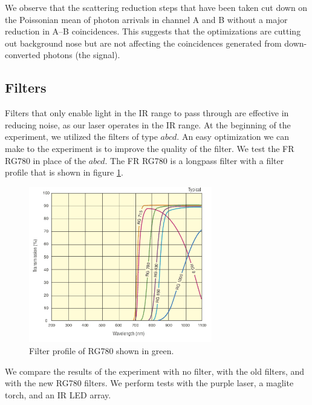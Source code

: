 \documentclass[letterpaper, 11 pt]{book}
\begin{document}
We observe that the scattering reduction steps that have been taken cut down on
the Poissonian mean of photon arrivals in channel A and B without a major
reduction in A--B coincidences. This suggests that the optimizations are cutting
out background nose but are not affecting the coincidences generated from
down-converted photons (the signal). 

\subsection{Filters}

Filters that only enable light in the IR range to pass through are effective in
reducing noise, as our laser operates in the IR range. At the beginning of the
experiment, we utilized the filters of type $abcd$. An easy optimization we can
make to the experiment is to improve the quality of the filter. We test the FR
RG780 in place of the $abcd$. The FR RG780 is a longpass filter with a filter
profile that is shown in figure \ref{fig:filter_prof}.
\begin{figure}[H]
    \centering
    \includegraphics[width = 8cm]{COLOR_FILT_XMIT_8_600w.png}
    \caption{Filter profile of RG780 shown in green.}
    \label{fig:filter_prof}
\end{figure}

We compare the results of the experiment with no filter, with the old filters,
and with the new RG780 filters. We perform tests with the purple laser, a
maglite torch, and an IR LED array.
\end{document}
